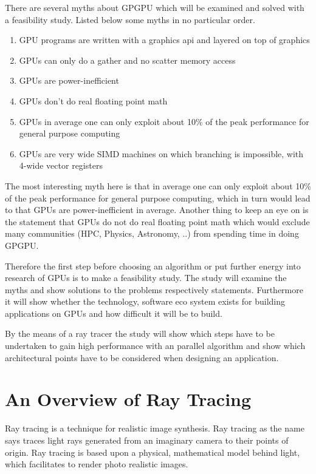 \label{chap:feas}
There are several myths about \gls{GPGPU} which will be examined and solved 
with a feasibility study. Listed below some myths in no particular order.
\begin{enumerate}
	\item \gls{GPU} programs are written with a graphics api and layered on top 
		of graphics
	\label{enum:api}
	\item \glspl{GPU} can only do a gather and no scatter memory access
	\label{enum:gather}
	\item \glspl{GPU} are power-inefficient
	\label{enum:ineff}
	\item \glspl{GPU} don't do real floating point math
	\label{enum:float}
	\item \glspl{GPU} in average one can only exploit about 10\% of the peak 
		performance for general purpose computing
	\label{enum:exploit}
	\item \glspl{GPU} are very wide \gls{SIMD} machines on which branching is 	  
		impossible, with 4-wide vector registers
 	\label{enum:simd}
\end{enumerate}

The most interesting myth here is that in average one can only exploit about
10\% of the peak performance for general purpose computing, which in turn would 
lead to that \glspl{GPU} are power-inefficient in average. Another thing to 
keep an eye on is the statement that \glspl{GPU} do not do real floating point
math which would exclude many communities (\gls{HPC}, Physics, Astronomy, ..)
 from spending time in doing \gls{GPGPU}. 

Therefore the first step before choosing an algorithm or put further energy into
research of \glspl{GPU} is to make a feasibility study. The study will examine
the myths and show solutions to the problems respectively statements.
Furthermore it will show whether the technology, software eco system exists for
building applications on \glspl{GPU} and how difficult it will be to build.

By the means of a ray tracer the study will show which steps have to be 
undertaken to gain high performance with an parallel algorithm and show which 
architectural points have to be considered when designing an application.

\section{An Overview of Ray Tracing}
Ray tracing is a technique for realistic image synthesis. Ray tracing as the
name says traces light rays generated from an imaginary camera to their points
of origin. Ray tracing is based upon a physical, mathematical model behind
light, which facilitates to render photo realistic images. 

